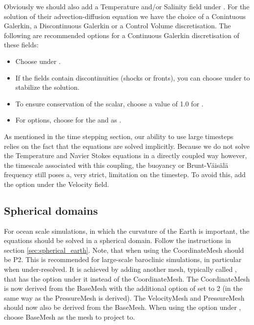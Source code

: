 Obviously we should also add a Temperature and/or Salinity field under
. For the solution of their advection-diffusion
equation we have the choice of a Conintuous Galerkin, a Discontinuous Galerkin
or a Control Volume discretisation. The following are recommended options for a
Continuous Galerkin discretisation of these fields:
\begin{itemize}
  \item Choose  under
    . 
  \item If the fields contain discontinuities (shocks or fronts), you can
    choose  under
     to stabilize the
    solution.
  \item To ensure conservation of the scalar, choose a value of 1.0 for
    . 
  \item For  options, choose  for the
     and  as .
\end{itemize}

As mentioned in the time stepping section, our ability to use large timesteps
relies on the fact that the equations are solved implicitly. Because we do not
solve the Temperature and Navier Stokes equations in a directly coupled way
however, the timescale associated with this coupling, the buoyancy or
Brunt-V\"ais\"al\"a frequency still poses a, very strict, limitation on the timestep. To
avoid this, add the option
 under the Velocity
field.

\subsection{Spherical domains}
\label{sec:ocean_on_the_sphere}
For ocean scale simulations, in which the curvature of the Earth is important,
the equations should be solved in a spherical domain. Follow the instructions
in section \ref{sec:spherical_earth}. Note, that when using
 the CoordinateMesh should be P2. This is
recommended for large-scale baroclinic simulations, in particular when
under-resolved. It is
achieved by adding another mesh, typically called , that has the
 option under it instead of the CoordinateMesh. The
CoordinateMesh is now derived from the BaseMesh with the additional option of
 set to 2 (in the same way as the PressureMesh is
derived). The VelocityMesh and PressureMesh should now also be derived from the
BaseMesh. When using the option  under
,
choose BaseMesh as the mesh to project to.

